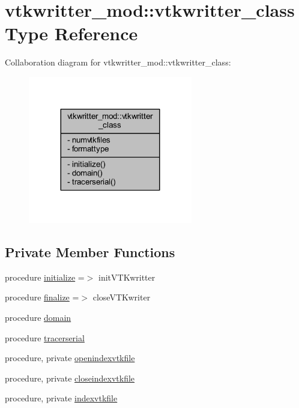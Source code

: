 \hypertarget{structvtkwritter__mod_1_1vtkwritter__class}{}\section{vtkwritter\+\_\+mod\+:\+:vtkwritter\+\_\+class Type Reference}
\label{structvtkwritter__mod_1_1vtkwritter__class}


Collaboration diagram for vtkwritter\+\_\+mod\+:\+:vtkwritter\+\_\+class\+:\nopagebreak
\begin{figure}[H]
\begin{center}
\leavevmode
\includegraphics[width=203pt]{structvtkwritter__mod_1_1vtkwritter__class__coll__graph}
\end{center}
\end{figure}
\subsection*{Private Member Functions}
\begin{DoxyCompactItemize}
\item 
procedure \mbox{\hyperlink{structvtkwritter__mod_1_1vtkwritter__class_ad74a863969884dacf4c8d9b96088c6a6}{initialize}} =$>$ init\+V\+T\+Kwritter
\item 
procedure \mbox{\hyperlink{structvtkwritter__mod_1_1vtkwritter__class_af59165b0d29d4de99d50c3db4dff848e}{finalize}} =$>$ close\+V\+T\+Kwriter
\item 
procedure \mbox{\hyperlink{structvtkwritter__mod_1_1vtkwritter__class_a7abd7831d763c178e15bd8b6fb7e358e}{domain}}
\item 
procedure \mbox{\hyperlink{structvtkwritter__mod_1_1vtkwritter__class_ad87da7194456a9b70f60f53f19a5c47b}{tracerserial}}
\item 
procedure, private \mbox{\hyperlink{structvtkwritter__mod_1_1vtkwritter__class_aab225b4fa3f3cd814f2760fe79bd426c}{openindexvtkfile}}
\item 
procedure, private \mbox{\hyperlink{structvtkwritter__mod_1_1vtkwritter__class_af87d85e730f5865b23012cea94d5274e}{closeindexvtkfile}}
\item 
procedure, private \mbox{\hyperlink{structvtkwritter__mod_1_1vtkwritter__class_a04e94de0e49912859408ce8bff14003c}{indexvtkfile}}
\end{DoxyCompactItemize}
